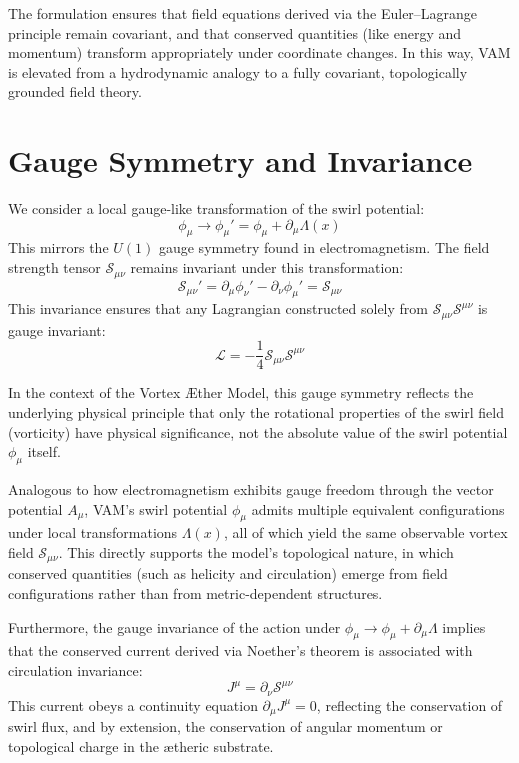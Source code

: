 The formulation ensures that field equations derived via the Euler–Lagrange principle remain covariant, and that conserved quantities (like energy and momentum) transform appropriately under coordinate changes. In this way, VAM is elevated from a hydrodynamic analogy to a fully covariant, topologically grounded field theory.

\section{Gauge Symmetry and Invariance}
We consider a local gauge-like transformation of the swirl potential:
\begin{equation}
    \phi_\mu \rightarrow \phi_\mu' = \phi_\mu + \partial_\mu \Lambda(x)
\end{equation}
This mirrors the $U(1)$ gauge symmetry found in electromagnetism. The field strength tensor $\mathcal{S}_{\mu\nu}$ remains invariant under this transformation:
\begin{equation}
    \mathcal{S}_{\mu\nu}' = \partial_\mu \phi_\nu' - \partial_\nu \phi_\mu' = \mathcal{S}_{\mu\nu}
\end{equation}
This invariance ensures that any Lagrangian constructed solely from $\mathcal{S}_{\mu\nu} \mathcal{S}^{\mu\nu}$ is gauge invariant:
\begin{equation}
    \mathcal{L} = -\frac{1}{4} \mathcal{S}_{\mu\nu} \mathcal{S}^{\mu\nu}
\end{equation}

In the context of the Vortex \AE{}ther Model, this gauge symmetry reflects the underlying physical principle that only the
rotational properties of the swirl field (vorticity) have physical significance, not the absolute value of the swirl potential $\phi_\mu$ itself.

Analogous to how electromagnetism exhibits gauge freedom through the vector potential $A_\mu$, VAM's swirl potential $\phi_\mu$ admits multiple equivalent configurations under local transformations $\Lambda(x)$, all of which yield the same observable vortex field $\mathcal{S}_{\mu\nu}$. This directly supports the model's topological nature, in which conserved quantities (such as helicity and circulation) emerge from field configurations rather than from metric-dependent structures.

Furthermore, the gauge invariance of the action under $\phi_\mu \rightarrow \phi_\mu + \partial_\mu \Lambda$ implies that the conserved current derived via Noether's theorem is associated with circulation invariance:
\begin{equation}
    J^\mu = \partial_\nu \mathcal{S}^{\mu\nu}
\end{equation}
This current obeys a continuity equation $\partial_\mu J^\mu = 0$, reflecting the conservation of swirl flux, and by extension, the conservation of angular momentum or topological charge in the ætheric substrate.

